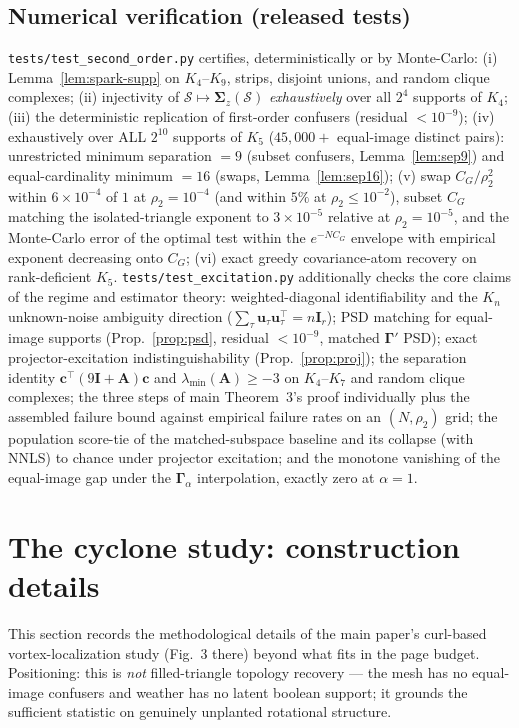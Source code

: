 \documentclass[11pt]{article}
\newcommand{\Scal}{\mathcal{S}}
\newcommand{\Gam}{\bm{\Gamma}}
\begin{document}
\subsection{Numerical verification (released tests)}

\texttt{tests/test\_second\_order.py} certifies, deterministically or by
Monte-Carlo: (i) Lemma~\ref{lem:spark-supp} on $K_4$--$K_9$, strips, disjoint
unions, and random clique complexes; (ii) injectivity of
$\Scal\mapsto\bm\Sigma_z(\Scal)$ \emph{exhaustively} over all $2^4$ supports
of $K_4$; (iii) the deterministic replication of first-order confusers
(residual $<10^{-9}$); (iv) exhaustively over ALL $2^{10}$ supports of $K_5$
($45{,}000+$ equal-image distinct pairs): unrestricted minimum separation
$=9$ (subset confusers, Lemma~\ref{lem:sep9}) and equal-cardinality minimum
$=16$ (swaps, Lemma~\ref{lem:sep16}); (v) swap
$C_G/\rho_2^2$ within $6\times10^{-4}$ of $1$ at $\rho_2=10^{-4}$ (and
within $5\%$ at $\rho_2\le10^{-2}$), subset $C_G$ matching the
isolated-triangle exponent to $3\times10^{-5}$ relative at
$\rho_2=10^{-5}$, and the Monte-Carlo error of the optimal test within the
$e^{-NC_G}$ envelope with empirical exponent decreasing onto $C_G$; (vi)
exact greedy covariance-atom recovery on rank-deficient $K_5$.
\texttt{tests/test\_excitation.py} additionally checks the core claims of the
regime and estimator theory: weighted-diagonal identifiability and the
$K_n$ unknown-noise ambiguity direction
($\sum_\tau\bm u_\tau\bm u_\tau^{\!\top}=n\bm I_r$); PSD matching for
equal-image supports (Prop.~\ref{prop:psd}, residual $<10^{-9}$, matched
$\Gam'$ PSD); exact projector-excitation indistinguishability
(Prop.~\ref{prop:proj}); the separation identity
$\bm c^{\!\top}(9\bm I+\bm A)\bm c$ and $\lambda_{\min}(\bm A)\ge-3$ on
$K_4$--$K_7$ and random clique complexes; the three steps of main
Theorem~3's proof individually plus the assembled failure bound against
empirical failure rates on an $(N,\rho_2)$ grid; the population score-tie of
the matched-subspace baseline and its collapse (with NNLS) to chance under
projector excitation; and the monotone vanishing of the equal-image gap
under the $\Gam_\alpha$ interpolation, exactly zero at $\alpha=1$.

\section{The cyclone study: construction details}\label{sec:cyclone}

This section records the methodological details of the main paper's
curl-based vortex-localization study (Fig.~3 there) beyond what fits in the
page budget. Positioning: this is \emph{not} filled-triangle topology
recovery --- the mesh has no equal-image confusers and weather has no latent
boolean support; it grounds the sufficient statistic on genuinely unplanted
rotational structure.
\end{document}
